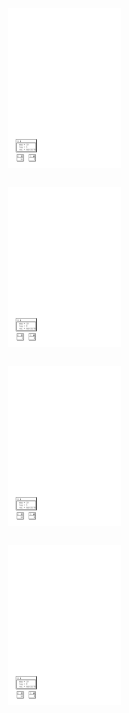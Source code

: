 \begin{figure}[H]
\begin{subfigure}[c]{0.33\textwidth}
		\end{subfigure}
		\begin{subfigure}[c]{0.33\textwidth}
			\centering
			\includegraphics[width=3cm,clip=true,trim=1cm 1cm 15cm 24cm]{../tests/ddd_graph/ddd_4_4}
		\end{subfigure}
		\begin{subfigure}[c]{0.33\textwidth}
			\centering
			\includegraphics[width=3cm,clip=true,trim=1cm 1cm 15cm 24cm]{../tests/ddd_graph/ddd_4_6}
		\end{subfigure}
		\begin{subfigure}[c]{0.33\textwidth}
			\centering
			\includegraphics[width=3cm,clip=true,trim=1cm 1cm 15cm 24cm]{../tests/ddd_graph/ddd_4_7}
		\end{subfigure}
		\begin{subfigure}[c]{0.33\textwidth}
			\centering
			\includegraphics[width=3cm,clip=true,trim=1cm 1cm 15cm 24cm]{../tests/ddd_graph/ddd_4_8}

\end{subfigure}
\end{figure}
